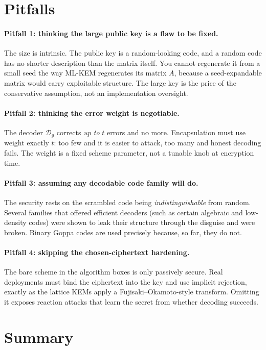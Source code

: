 \section{Pitfalls}

\paragraph{Pitfall 1: thinking the large public key is a flaw to be fixed.}
The size is intrinsic. The public key is a random-looking code, and a random code has no shorter description than the matrix itself. You cannot regenerate it from a small seed the way ML-KEM regenerates its matrix $A$, because a seed-expandable matrix would carry exploitable structure. The large key is the price of the conservative assumption, not an implementation oversight.

\paragraph{Pitfall 2: thinking the error weight is negotiable.}
The decoder $\mathcal{D}_g$ corrects \emph{up to} $t$ errors and no more. Encapsulation must use weight exactly $t$: too few and it is easier to attack, too many and honest decoding fails. The weight is a fixed scheme parameter, not a tunable knob at encryption time.

\paragraph{Pitfall 3: assuming any decodable code family will do.}
The security rests on the scrambled code being \emph{indistinguishable} from random. Several families that offered efficient decoders (such as certain algebraic and low-density codes) were shown to leak their structure through the disguise and were broken. Binary Goppa codes are used precisely because, so far, they do not.

\paragraph{Pitfall 4: skipping the chosen-ciphertext hardening.}
The bare scheme in the algorithm boxes is only passively secure. Real deployments must bind the ciphertext into the key and use implicit rejection, exactly as the lattice KEMs apply a Fujisaki--Okamoto-style transform. Omitting it exposes reaction attacks that learn the secret from whether decoding succeeds.

\section{Summary}

